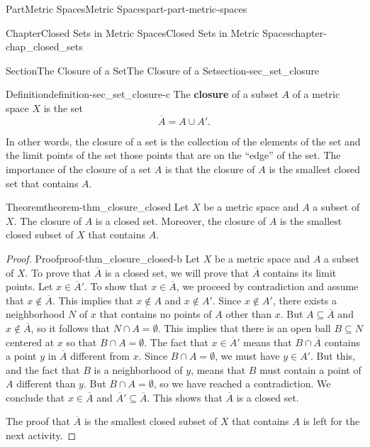 \documentclass[oneside,10pt,]{book}
\newcommand{\terminology}[1]{\textbf{#1}}
\numberwithin{equation}{chapter}
\begin{document}
\begin{partptx}{Part}{Metric Spaces}{}{Metric Spaces}{}{}{part-part-metric-spaces}
\begin{chapterptx}{Chapter}{Closed Sets in Metric Spaces}{}{Closed Sets in Metric Spaces}{}{}{chapter-chap_closed_sets}
\begin{sectionptx}{Section}{The Closure of a Set}{}{The Closure of a Set}{}{}{section-sec_set_closure}
\begin{definition}{Definition}{}{definition-sec_set_closure-c}%
%
The \terminology{closure} of a subset \(A\) of a metric space \(X\) is the set%
\begin{equation*}
\overline{A} = A \cup A'\text{.}
\end{equation*}
%
\end{definition}
In other words, the closure of a set is the collection of the elements of the set and the limit points of the set \textemdash{} those points that are on the ``edge'' of the set. The importance of the closure of a set \(A\) is that the closure of \(A\) is the smallest closed set that contains \(A\).%
\begin{theorem}{Theorem}{}{}{theorem-thm_closure_closed}%
Let \(X\) be a metric space and \(A\) a subset of \(X\). The closure of \(A\) is a closed set. Moreover, the closure of \(A\) is the smallest closed subset of \(X\) that contains \(A\).%
\end{theorem}
\begin{proof}{Proof}{}{proof-thm_closure_closed-b}
Let \(X\) be a metric space and \(A\) a subset of \(X\). To prove that \(\overline{A}\) is a closed set, we will prove that \(\overline{A}\) contains its limit points. Let \(x \in \overline{A}'\). To show that \(x \in \overline{A}\), we proceed by contradiction and assume that \(x \notin \overline{A}\). This implies that \(x \notin A\) and \(x \notin A'\). Since \(x \notin A'\), there exists a neighborhood \(N\) of \(x\) that contains no points of \(A\) other than \(x\). But \(A \subseteq \overline{A}\) and \(x \notin \overline{A}\), so it follows that \(N \cap A = \emptyset\). This implies that there is an open ball \(B \subseteq N\) centered at \(x\) so that \(B \cap A = \emptyset\). The fact that \(x \in \overline{A}'\) means that \(B \cap \overline{A}\) contains a point \(y\) in \(\overline{A}\) different from \(x\). Since \(B \cap A = \emptyset\), we must have \(y \in A'\). But this, and the fact that \(B\) is a neighborhood of \(y\), means that \(B\) must contain a point of \(A\) different than \(y\). But \(B \cap A = \emptyset\), so we have reached a contradiction. We conclude that \(x \in \overline{A}\) and \(\overline{A}' \subseteq \overline{A}\). This shows that \(\overline{A}\) is a closed set.%
\par
The proof that \(\overline{A}\) is the smallest closed subset of \(X\) that contains \(A\) is left for the next activity.%
\end{proof}

\end{sectionptx}
\end{chapterptx}
\end{partptx}
\end{document}
